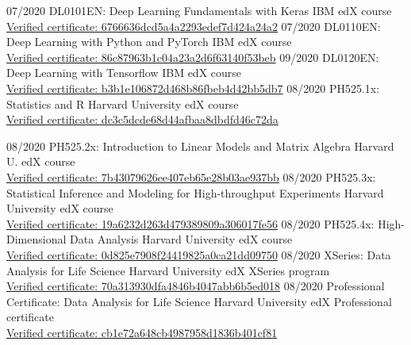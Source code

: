 \documentclass[]{friggeri-cv}
\begin{document}
\begin{entrylist}
\entry
    {07/2020}
    {DL0101EN: Deep Learning Fundamentals with Keras}
    {IBM}
    {edX course\\
    {\href{https://courses.edx.org/certificates/6766636dcd5a4a2293edef7d424a24a2}{Verified certificate: 6766636dcd5a4a2293edef7d424a24a2}}
    }
\entry
    {07/2020}
    {DL0110EN: Deep Learning with Python and PyTorch}
    {IBM}
    {edX course\\
    {\href{https://courses.edx.org/certificates/86c87963b1c04a23a2d6f63140f53beb}{Verified certificate: 86c87963b1c04a23a2d6f63140f53beb}}
    }
  \entry
    {09/2020}
    {DL0120EN: Deep Learning with Tensorflow}
    {IBM}
    {edX course\\
    {\href{https://courses.edx.org/certificates/b3b1e106872d468b86fbeb4d42bb5db7}{Verified certificate: b3b1e106872d468b86fbeb4d42bb5db7}}
    } 
    \entry
    {08/2020}
    {PH525.1x: Statistics and R}
    {Harvard University}
    {edX course\\
    {\href{https://courses.edx.org/certificates/dc3c5dcde68d44afbaa8dbdfd46c72da}{Verified certificate: dc3c5dcde68d44afbaa8dbdfd46c72da}}
    }
    
\entry
    {08/2020}
    {PH525.2x: Introduction to Linear Models and Matrix Algebra}
    {Harvard U.}
    {edX course\\
    {\href{https://courses.edx.org/certificates/7b43079626ee407eb65e28b03ae937bb}{Verified certificate: 7b43079626ee407eb65e28b03ae937bb}}
    } 
\entry
    {08/2020}
    {PH525.3x: Statistical Inference and Modeling for High-throughput Experiments}
    {Harvard University}
    {edX course\\
    {\href{https://courses.edx.org/certificates/19a6232d263d479389809a306017fe56}{Verified certificate: 19a6232d263d479389809a306017fe56}}
    } 
    \entry
    {08/2020}
    {PH525.4x: High-Dimensional Data Analysis}
    {Harvard University}
    {edX course\\
    {\href{https://courses.edx.org/certificates/0d825e7908f24419825a0ca21dd09750}{Verified certificate: 0d825e7908f24419825a0ca21dd09750}}
    } 
    \entry
    {08/2020}
    {XSeries: Data Analysis for Life Science}
    {Harvard University}
    {edX XSeries program\\
    {\href{https://credentials.edx.org/credentials/70a313930dfa4846b4047abb6b5ed018/}{Verified certificate: 70a313930dfa4846b4047abb6b5ed018}}
    }
    \entry
    {08/2020}
    {Professional Certificate: Data Analysis for Life Science}
    {Harvard University}
    {edX Professional certificate\\
    {\href{https://credentials.edx.org/credentials/cb1e72a648cb4987958d1836b401cf81/}{Verified certificate: cb1e72a648cb4987958d1836b401cf81}}
    }
\end{entrylist}
\end{document}
